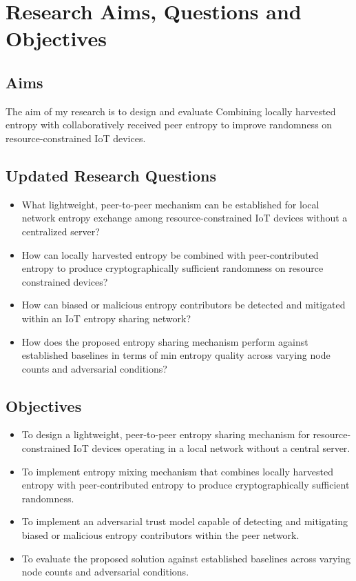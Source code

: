 \documentclass[a4paper, 12pt]{article}
\begin{document}
\section{Research Aims, Questions and Objectives}
\subsection{Aims}

The aim of my research is to design and evaluate Combining locally harvested entropy with collaboratively received peer entropy to improve randomness on resource-constrained IoT devices.

\subsection{Updated Research Questions}

\begin{itemize}
    \item What lightweight, peer-to-peer mechanism can be established for local network entropy exchange among resource-constrained IoT devices without a centralized server?
    \item How can locally harvested entropy be combined with peer-contributed entropy to produce cryptographically sufficient randomness on resource constrained devices?
    \item How can biased or malicious entropy contributors be detected and mitigated within an IoT entropy sharing network?
    \item How does the proposed entropy sharing mechanism perform against established baselines in terms of min entropy quality across varying node counts and adversarial conditions?

\end{itemize}


\subsection{Objectives}

\begin{itemize}
    \item To design a lightweight, peer-to-peer entropy sharing mechanism for resource-constrained IoT devices operating in a local network without a central server.

    \item To implement entropy mixing mechanism that combines locally harvested entropy with peer-contributed entropy to produce cryptographically sufficient randomness.
    
    \item To implement an adversarial trust model capable of detecting and mitigating biased or malicious entropy contributors within the peer network.

    \item To evaluate the proposed solution against established baselines across varying node counts and adversarial conditions.

\end{itemize}
\end{document}
